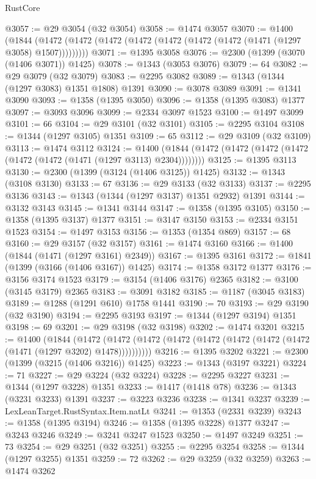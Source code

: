\begin{lexlean}{RustCore}
\begin{coremodule}
@3057 := @29 @3054 (@32 @3054)
@3058 := @1474 @3057
@3070 := @1400
    (@1844 (@1472 (@1472 (@1472 (@1472 (@1472 (@1472 (@1472 (@1471 (@1297 @3058) @1507)))))))))
@3071 := @1395 @3058
@3076 := @2300 (@1399 (@3070 (@1406 @3071)) @1425)
@3078 := @1343 (@3053 @3076)
@3079 := 64
@3082 := @29 @3079 (@32 @3079)
@3083 := @2295 @3082
@3089 := @1343 (@1344 (@1297 @3083) @1351 @1808) @1391
@3090 := @3078 @3089
@3091 := @1341 @3090
@3093 := @1358 (@1395 @3050)
@3096 := @1358 (@1395 @3083) @1377
@3097 := @3093 @3096
@3099 := @2334 @3097 @1523
@3100 := @1497 @3099
@3101 := 66
@3104 := @29 @3101 (@32 @3101)
@3105 := @2295 @3104
@3108 := @1344 (@1297 @3105) @1351
@3109 := 65
@3112 := @29 @3109 (@32 @3109)
@3113 := @1474 @3112
@3124 := @1400 (@1844 (@1472 (@1472 (@1472 (@1472 (@1472 (@1472 (@1471 (@1297 @3113) @2304))))))))
@3125 := @1395 @3113
@3130 := @2300 (@1399 (@3124 (@1406 @3125)) @1425)
@3132 := @1343 (@3108 @3130)
@3133 := 67
@3136 := @29 @3133 (@32 @3133)
@3137 := @2295 @3136
@3143 := @1343 (@1344 (@1297 @3137) @1351 @2932) @1391
@3144 := @3132 @3143
@3145 := @1341 @3144
@3147 := @1358 (@1395 @3105)
@3150 := @1358 (@1395 @3137) @1377
@3151 := @3147 @3150
@3153 := @2334 @3151 @1523
@3154 := @1497 @3153
@3156 := @1353 (@1354 @869)
@3157 := 68
@3160 := @29 @3157 (@32 @3157)
@3161 := @1474 @3160
@3166 := @1400 (@1844 (@1471 (@1297 @3161) @2349))
@3167 := @1395 @3161
@3172 := @1841 (@1399 (@3166 (@1406 @3167)) @1425)
@3174 := @1358 @3172 @1377
@3176 := @3156 @3174 @1523
@3179 := @3154 (@1406 @3176) @2365
@3182 := @3100 (@3145 @3179) @2365
@3183 := @3091 @3182
@3185 := @1187 (@3045 @3183)
@3189 := @1288 (@1291 @610) @1758 @1441
@3190 := 70
@3193 := @29 @3190 (@32 @3190)
@3194 := @2295 @3193
@3197 := @1344 (@1297 @3194) @1351
@3198 := 69
@3201 := @29 @3198 (@32 @3198)
@3202 := @1474 @3201
@3215 := @1400
    (@1844
      (@1472 (@1472 (@1472 (@1472 (@1472 (@1472 (@1472 (@1472 (@1471 (@1297 @3202) @1478))))))))))
@3216 := @1395 @3202
@3221 := @2300 (@1399 (@3215 (@1406 @3216)) @1425)
@3223 := @1343 (@3197 @3221)
@3224 := 71
@3227 := @29 @3224 (@32 @3224)
@3228 := @2295 @3227
@3231 := @1344 (@1297 @3228) @1351
@3233 := @1417 (@1418 @78)
@3236 := @1343 (@3231 @3233) @1391
@3237 := @3223 @3236
@3238 := @1341 @3237
@3239 := LexLeanTarget.RustSyntax.Item.natLt
@3241 := @1353 (@2331 @3239)
@3243 := @1358 (@1395 @3194)
@3246 := @1358 (@1395 @3228) @1377
@3247 := @3243 @3246
@3249 := @3241 @3247 @1523
@3250 := @1497 @3249
@3251 := 73
@3254 := @29 @3251 (@32 @3251)
@3255 := @2295 @3254
@3258 := @1344 (@1297 @3255) @1351
@3259 := 72
@3262 := @29 @3259 (@32 @3259)
@3263 := @1474 @3262

\end{coremodule}
\end{lexlean}
